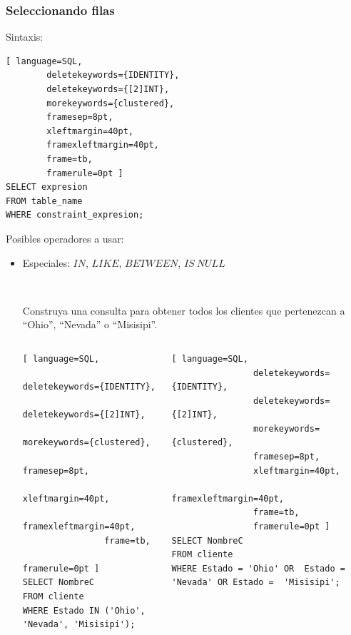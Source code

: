 \documentclass[
	10pt, %
	aspectratio=169, %
]{beamer}
\begin{document}
\begin{frame}[fragile]
	
	\frametitle{Seleccionando filas}
	
	Sintaxis:
	\begin{lstlisting}[ language=SQL,
		deletekeywords={IDENTITY},
		deletekeywords={[2]INT},
		morekeywords={clustered},
		framesep=8pt,
		xleftmargin=40pt,
		framexleftmargin=40pt,
		frame=tb,
		framerule=0pt ]
SELECT expresion
FROM table_name
WHERE constraint_expresion;
\end{lstlisting} 
	
	Posibles operadores a usar: 
	\begin{itemize}
		
		\item Especiales: $IN$, $LIKE$, $BETWEEN$, $IS\ NULL$
		
		\pause 
		
		\ 
		
		Construya una consulta para obtener todos los clientes que pertenezcan a ``Ohio'', ``Nevada'' o ``Misisipi''.
		
		\pause
		
		\begin{columns}[t]
			\begin{lstlisting}[ language=SQL,
				deletekeywords={IDENTITY},
				deletekeywords={[2]INT},
				morekeywords={clustered},
				framesep=8pt,
				xleftmargin=40pt,
				framexleftmargin=40pt,
				frame=tb,
				framerule=0pt ]
SELECT NombreC 
FROM cliente 
WHERE Estado IN ('Ohio', 'Nevada', 'Misisipi');
\end{lstlisting}
			
			\begin{lstlisting}[ language=SQL,
				deletekeywords={IDENTITY},
				deletekeywords={[2]INT},
				morekeywords={clustered},
				framesep=8pt,
				xleftmargin=40pt,
				framexleftmargin=40pt,
				frame=tb,
				framerule=0pt ]
SELECT NombreC 
FROM cliente 
WHERE Estado = 'Ohio' OR  Estado = 'Nevada' OR Estado =  'Misisipi';
\end{lstlisting}
			
		\end{columns}
		
	\end{itemize}
	
\end{frame}

\end{document}

